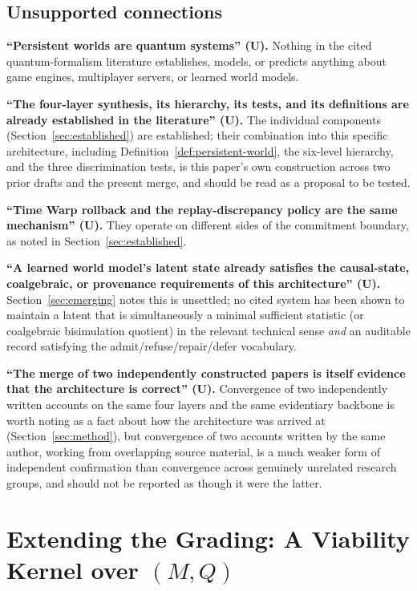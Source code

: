 \documentclass[11pt]{article}
\begin{document}
\subsection{Unsupported connections}
\label{sec:unsupported}

\textbf{``Persistent worlds are quantum systems'' (U).} Nothing in the cited quantum-formalism literature establishes, models, or predicts anything about game engines, multiplayer servers, or learned world models.

\textbf{``The four-layer synthesis, its hierarchy, its tests, and its definitions are already established in the literature'' (U).} The individual components (Section~\ref{sec:established}) are established; their combination into this specific architecture, including Definition~\ref{def:persistent-world}, the six-level hierarchy, and the three discrimination tests, is this paper's own construction across two prior drafts and the present merge, and should be read as a proposal to be tested.

\textbf{``Time Warp rollback and the replay-discrepancy policy are the same mechanism'' (U).} They operate on different sides of the commitment boundary, as noted in Section~\ref{sec:established}.

\textbf{``A learned world model's latent state already satisfies the causal-state, coalgebraic, or provenance requirements of this architecture'' (U).} Section~\ref{sec:emerging} notes this is unsettled; no cited system has been shown to maintain a latent that is simultaneously a minimal sufficient statistic (or coalgebraic bisimulation quotient) in the relevant technical sense \emph{and} an auditable record satisfying the admit/refuse/repair/defer vocabulary.

\textbf{``The merge of two independently constructed papers is itself evidence that the architecture is correct'' (U).} Convergence of two independently written accounts on the same four layers and the same evidentiary backbone is worth noting as a fact about how the architecture was arrived at (Section~\ref{sec:method}), but convergence of two accounts written by the same author, working from overlapping source material, is a much weaker form of independent confirmation than convergence across genuinely unrelated research groups, and should not be reported as though it were the latter.

\section{Extending the Grading: A Viability Kernel over $(M,Q)$}
\label{sec:viability-extension}
\end{document}

